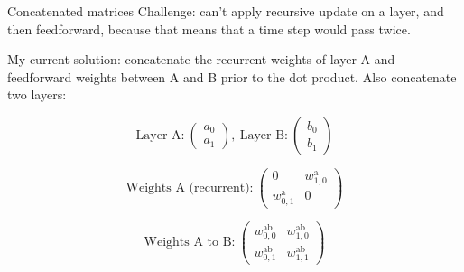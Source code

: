 \documentclass[t]{beamer}
\newcommand*\vc[1]%
{\left(\begin{array}{cccc}#1\end{array}\right)}
\begin{document}
\begin{frame}{Concatenated matrices}
Challenge: can't apply recursive update on a layer, and then feedforward, because that means that a time step would pass twice.

My current solution: concatenate the recurrent weights of layer A and feedforward weights between A and B prior to the dot product. Also concatenate two layers:

\begin{equation*}
   \text{Layer A:}\ \vc{a_0\\a_1},\ \text{Layer B:}\ \vc{b_0\\b_1}
\end{equation*}

\begin{equation*}
   \text{Weights A (recurrent):}\ \vc{0 & w_{1,0}^\text{a}\\w_{0,1}^\text{a} & 0}
\end{equation*}

\begin{equation*}
   \text{Weights A to B:}\ \vc{w_{0,0}^\text{ab} & w_{1,0}^\text{ab}\\w_{0, 1}^\text{ab} & w_{1,1}^\text{ab}}
\end{equation*}
\end{frame}
\end{document}
